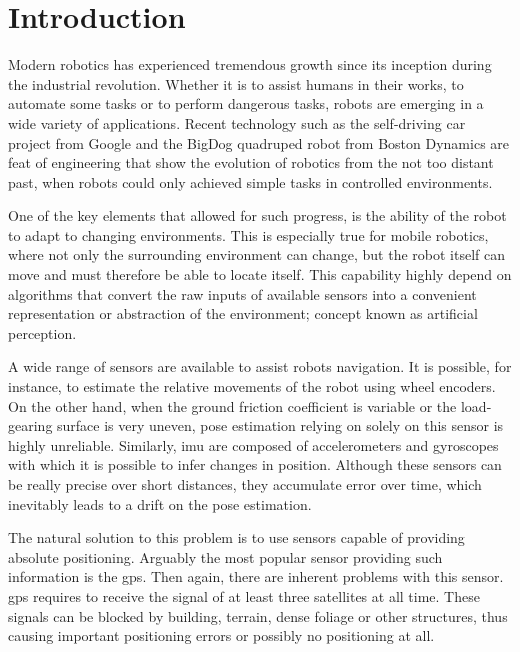 \chapter*{Introduction} 

Modern robotics has experienced tremendous growth since its inception during the industrial revolution. Whether it is to assist humans in their works, to automate some tasks or to perform dangerous tasks, robots are emerging in a wide variety of applications. Recent technology such as the self-driving car project from Google and the BigDog quadruped robot from Boston Dynamics are feat of engineering that show the evolution of robotics from the not too distant past, when robots could only achieved simple tasks in controlled environments.

One of the key elements that allowed for such progress, is the ability of the robot to adapt to changing environments. This is especially true for mobile robotics, where not only the surrounding environment can change, but the robot itself can move and must therefore be able to locate itself. This capability highly depend on algorithms that convert the raw inputs of available sensors into a convenient representation or abstraction of the environment; concept known as artificial perception.

A wide range of sensors are available to assist robots navigation. It is possible, for instance, to estimate the relative movements of the robot using wheel encoders. On the other hand, when the ground friction coefficient is variable or the load-gearing surface is very uneven, pose estimation relying on solely on this sensor is highly unreliable. Similarly, \gls*{imu} are composed of accelerometers and gyroscopes with which it is possible to infer changes in position. Although these sensors can be really precise over short distances, they accumulate error over time, which inevitably leads to a drift on the pose estimation.

The natural solution to this problem is to use sensors capable of providing absolute positioning. Arguably the most popular sensor providing such information is the \gls*{gps}. Then again, there are inherent problems with this sensor. \gls*{gps} requires to receive the signal of at least three satellites at all time. These signals can be blocked by building, terrain, dense foliage or other structures, thus causing important positioning errors or possibly no positioning at all.

